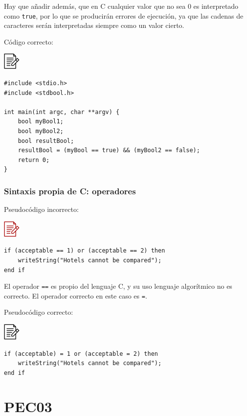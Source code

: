 \documentclass[
]{book}
\begin{document}
Hay que añadir además, que en C cualquier valor que no sea 0 es interpretado como \texttt{true}, por lo que se producirán errores de ejecución, ya que las cadenas de caracteres serán interpretadas siempre como un valor cierto.

Código correcto:

\includegraphics{./img/alg.png}

\begin{verbatim}
#include <stdio.h>
#include <stdbool.h>

int main(int argc, char **argv) {
    bool myBool1;
    bool myBool2;
    bool resultBool;
    resultBool = (myBool == true) && (myBool2 == false);
    return 0;
}
\end{verbatim}

\hypertarget{sintaxis-propia-de-c-operadores}{%
\subsection{Sintaxis propia de C: operadores}\label{sintaxis-propia-de-c-operadores}}

Pseudocódigo incorrecto:

\includegraphics{./img/alg_err.png}

\begin{verbatim}
if (acceptable == 1) or (acceptable == 2) then
    writeString("Hotels cannot be compared");
end if
\end{verbatim}

El operador \texttt{==} es propio del lenguaje C, y su uso lenguaje algorítmico no es correcto. El operador correcto en este caso es \texttt{=}.

Pseudocódigo correcto:

\includegraphics{./img/alg.png}

\begin{verbatim}
if (acceptable) = 1 or (acceptable = 2) then
    writeString("Hotels cannot be compared");
end if
\end{verbatim}

\hypertarget{pec03}{%
\chapter{PEC03}\label{pec03}}
\end{document}
